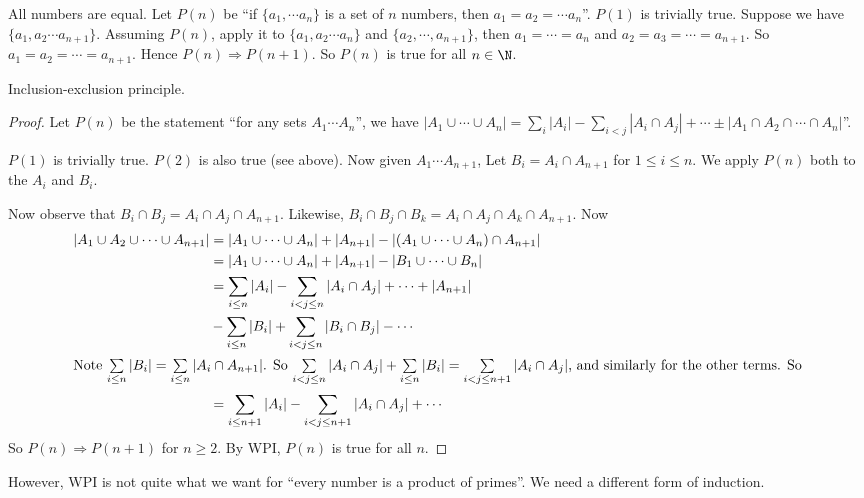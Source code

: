 \documentclass[a4paper]{article}
\begin{document}
\begin{eg}
  All numbers are equal. Let $P(n)$ be ``if $\{a_1, \cdots a_n\}$ is a set of $n$ numbers, then $a_1 = a_2 = \cdots a_n$''. $P(1)$ is trivially true. Suppose we have $\{a_1, a_2\cdots a_{n+1}\}$. Assuming $P(n)$, apply it to $\{a_1, a_2\cdots a_n\}$ and $\{a_2, \cdots , a_{n + 1}\}$, then $a_1 = \cdots = a_n$ and $a_2 = a_3 = \cdots = a_{n + 1}$. So $a_1 = a_2 = \cdots = a_{n + 1}$. Hence $P(n)\Rightarrow P(n + 1)$. So $P(n)$ is true for all $n\in \N$.
\end{eg}

\begin{thm}
  Inclusion-exclusion principle.
\end{thm}

\begin{proof}
  Let $P(n)$ be the statement ``for any sets $A_1\cdots A_n$'', we have $|A_1\cup \cdots \cup A_n| = \sum_i|A_i| - \sum_{i < j} |A_i\cap A_j| + \cdots \pm |A_1\cap A_2\cap \cdots \cap A_n|$''.

  $P(1)$ is trivially true. $P(2)$ is also true (see above). Now given $A_1 \cdots A_{n + 1}$, Let $B_i = A_i\cap A_{n + 1}$ for $1 \leq i\leq n$. We apply $P(n)$ both to the $A_i$ and $B_i$.

  Now observe that $B_i\cap B_j = A_i\cap A_j \cap A_{n + 1}$. Likewise, $B_i\cap B_j\cap B_k = A_i\cap A_j\cap A_k\cap A_{n + 1}$. Now
  \begin{align*}
    |A_1\cup A_2\cup \cdots \cup A_{n + 1}| &= |A_1\cup \cdots \cup A_n| + |A_{n + 1}| - |(A_1\cup\cdots\cup A_n)\cap A_{n + 1}|\\
    &= |A_1\cup \cdots \cup A_n| + |A_{n + 1}| - |B_{1}\cup \cdots \cup B_n|\\
    &= \sum_{i\leq n}|A_i| - \sum_{i < j\leq n}|A_i\cap A_j| + \cdots + |A_{n + 1}| \\
    &-\sum_{i \leq n}|B_i| + \sum_{i < j\leq n}|B_i\cap B_j| - \cdots \\
    \intertext{Note $\sum\limits_{i\leq n}|B_i| = \sum\limits_{i\leq n}|A_i\cap A_{n + 1}|$. So $\sum\limits_{i < j\leq n}|A_i\cap A_j| + \sum\limits_{i\leq n}|B_i| = \sum\limits_{i< j \leq n + 1}|A_i \cap A_j|$, and similarly for the other terms. So}
    &= \sum_{i \leq n + 1}|A_i| - \sum_{i< j \leq n + 1}|A_i \cap A_j| + \cdots
  \end{align*}
  So $P(n)\Rightarrow P(n + 1)$ for $n\geq 2$. By WPI, $P(n)$ is true for all $n$.
\end{proof}

However, WPI is not quite what we want for ``every number is a product of primes''. We need a different form of induction.
\end{document}
